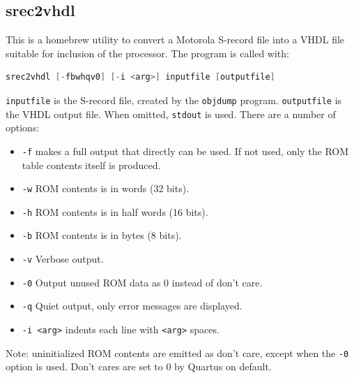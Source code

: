 \documentclass[12pt]{article}
\begin{document}
\subsection{srec2vhdl}
This is a homebrew utility to convert a Motorola S-record file into a VHDL file suitable for inclusion of the processor. The program is called with:

\begin{lstlisting}[language=c]
srec2vhdl [-fbwhqv0] [-i <arg>] inputfile [outputfile]
\end{lstlisting}

\lstinline|inputfile| is the S-record file, created by the \lstinline|objdump| program. \lstinline|outputfile| is the VHDL output file. When omitted, \lstinline|stdout| is used. There are a number of options:

\begin{itemize}
\item \lstinline|-f| makes a full output that directly can be used. If not used, only the ROM table contents itself is produced.
\item \lstinline|-w| ROM contents is in words (32 bits).
\item \lstinline|-h| ROM contents is in half words (16 bits).
\item \lstinline|-b| ROM contents is in bytes (8 bits).
\item \lstinline|-v| Verbose output.
\item \lstinline|-0| Output unused ROM data as 0 instead of don't care.
\item \lstinline|-q| Quiet output, only error messages are displayed.
\item \lstinline|-i <arg>| indents each line with \lstinline|<arg>| spaces.
\end{itemize}

Note: uninitialized ROM contents are emitted as don't care, except when the \lstinline|-0| option is used. Don't cares are set to 0 by Quartus on default.
\end{document}
